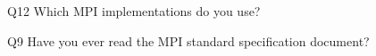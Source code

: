 \begin{description}%
\item{Q12} Which MPI implementations do you use?%
\item{Q9} Have you ever read the MPI standard specification document?%
\end{description}%
